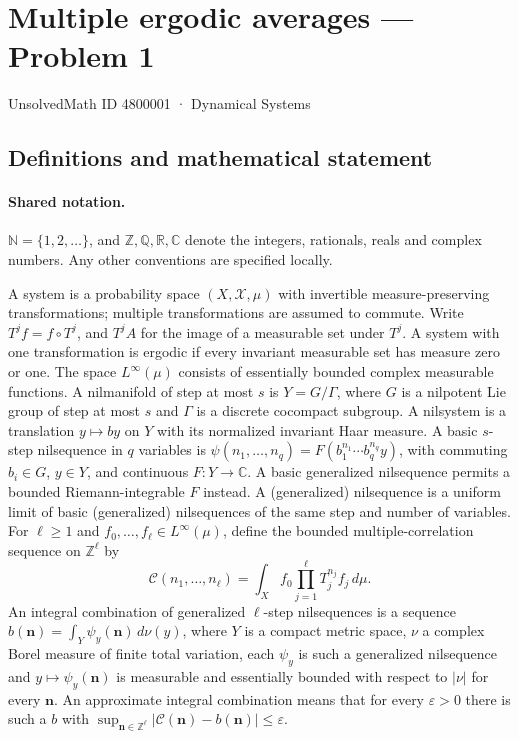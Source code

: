 \documentclass[11pt]{article}
\begin{document}
\setcounter{section}{4800000}
\section{Multiple ergodic averages — Problem 1}\label{4800001}
{\small\sffamily UnsolvedMath ID 4800001 · Dynamical Systems}
\subsection{Definitions and mathematical statement}

\paragraph{Shared notation.}$\mathbb N=\{1,2,\ldots\}$, and $\mathbb Z,\mathbb Q,\mathbb R,\mathbb C$ denote the integers, rationals, reals and complex numbers. Any other conventions are specified locally.


A system is a probability space $(X,\mathcal X,\mu)$ with invertible measure-preserving transformations; multiple transformations are assumed to commute. Write $T^j f=f\circ T^j$, and $T^j A$ for the image of a measurable set under $T^j$. A system with one transformation is ergodic if every invariant measurable set has measure zero or one. The space $L^\infty(\mu)$ consists of essentially bounded complex measurable functions. A nilmanifold of step at most $s$ is $Y=G/\Gamma$, where $G$ is a nilpotent Lie group of step at most $s$ and $\Gamma$ is a discrete cocompact subgroup. A nilsystem is a translation $y\mapsto by$ on $Y$ with its normalized invariant Haar measure. A basic $s$-step nilsequence in $q$ variables is $\psi(n_1,\ldots,n_q)=F(b_1^{n_1}\cdots b_q^{n_q}y)$, with commuting $b_i\in G$, $y\in Y$, and continuous $F:Y\to\mathbb C$. A basic generalized nilsequence permits a bounded Riemann-integrable $F$ instead. A (generalized) nilsequence is a uniform limit of basic (generalized) nilsequences of the same step and number of variables. For $\ell\ge1$ and $f_0,\ldots,f_\ell\in L^\infty(\mu)$, define the bounded multiple-correlation sequence on $\mathbb Z^\ell$ by \[\mathcal C(n_1,\ldots,n_\ell)=\int_X f_0\prod_{j=1}^\ell T_j^{n_j}f_j\,d\mu.\] An integral combination of generalized $\ell$-step nilsequences is a sequence $b(\mathbf n)=\int_Y\psi_y(\mathbf n)\,d\nu(y)$, where $Y$ is a compact metric space, $\nu$ a complex Borel measure of finite total variation, each $\psi_y$ is such a generalized nilsequence and $y\mapsto\psi_y(\mathbf n)$ is measurable and essentially bounded with respect to $|\nu|$ for every $\mathbf n$. An approximate integral combination means that for every $\varepsilon>0$ there is such a $b$ with $\sup_{\mathbf n\in\mathbb Z^\ell}|\mathcal C(\mathbf n)-b(\mathbf n)|\le\varepsilon$.
\end{document}
